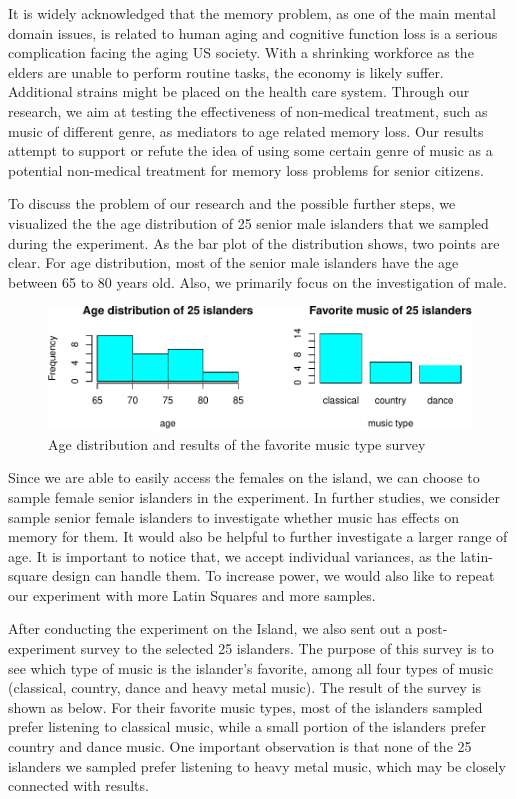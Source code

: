 \documentclass[]{article}
\begin{document}
It is widely acknowledged that the memory problem, as one of the main
mental domain issues, is related to human aging and cognitive function
loss is a serious complication facing the aging US society. With a
shrinking workforce as the elders are unable to perform routine tasks,
the economy is likely suffer. Additional strains might be placed on the
health care system. Through our research, we aim at testing the
effectiveness of non-medical treatment, such as music of different
genre, as mediators to age related memory loss. Our results attempt to
support or refute the idea of using some certain genre of music as a
potential non-medical treatment for memory loss problems for senior
citizens.

To discuss the problem of our research and the possible further steps,
we visualized the the age distribution of 25 senior male islanders that
we sampled during the experiment. As the bar plot of the distribution
shows, two points are clear. For age distribution, most of the senior
male islanders have the age between 65 to 80 years old. Also, we
primarily focus on the investigation of male.

\begin{figure}
\centering
\includegraphics{STATS101B-Project-Code_files/figure-latex/unnamed-chunk-9-1.pdf}
\caption{Age distribution and results of the favorite music type survey}
\end{figure}

Since we are able to easily access the females on the island, we can
choose to sample female senior islanders in the experiment. In further
studies, we consider sample senior female islanders to investigate
whether music has effects on memory for them. It would also be helpful
to further investigate a larger range of age. It is important to notice
that, we accept individual variances, as the latin-square design can
handle them. To increase power, we would also like to repeat our
experiment with more Latin Squares and more samples.

After conducting the experiment on the Island, we also sent out a
post-experiment survey to the selected 25 islanders. The purpose of this
survey is to see which type of music is the islander's favorite, among
all four types of music (classical, country, dance and heavy metal
music). The result of the survey is shown as below. For their favorite
music types, most of the islanders sampled prefer listening to classical
music, while a small portion of the islanders prefer country and dance
music. One important observation is that none of the 25 islanders we
sampled prefer listening to heavy metal music, which may be closely
connected with results.
\end{document}
